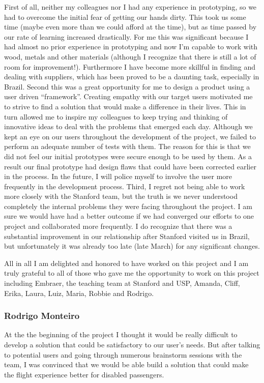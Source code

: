 First of all, neither my colleagues nor I had any experience in prototyping, so we had to overcome the initial fear of getting our hands dirty. This took us some time (maybe even more than we could afford at the time), but as time passed by our rate of learning increased drastically. For me this was significant because I had almost no prior experience in prototyping and now I’m capable to work with wood, metals and other materials (although I recognize that there is still a lot of room for improvement!). Furthermore I have become more skillful in finding and dealing with suppliers, which has been proved to be a daunting task, especially in Brazil.
Second this was a great opportunity for me to design a product using a user driven “framework”. Creating empathy with our target users motivated me to strive to find a solution that would make a difference in their lives. This in turn allowed me to inspire my colleagues to keep trying and thinking of innovative ideas to deal with the problems that emerged each day. Although we kept an eye on our users throughout the development of the project, we failed to perform an adequate number of tests with them. The reason for this is that we did not feel our initial prototypes were secure enough to be used by them. As a result our final prototype had design flaws that could have been corrected earlier in the process. In the future, I will police myself to involve the user more frequently in the development process.
Third, I regret not being able to work more closely with the Stanford team, but the truth is we never understood completely the internal problems they were facing throughout the project. I am sure we would have had a better outcome if we had converged our efforts to one project and collaborated more frequently. I do recognize that there was a substantial improvement in our relationship after Stanford visited us in Brazil, but unfortunately it was already too late (late March) for any significant changes.

All in all I am delighted and honored to have worked on this project and I am truly grateful to all of those who gave me the opportunity to work on this project including Embraer, the teaching team at Stanford and USP, Amanda, Cliff, Erika, Laura, Luiz, Maria, Robbie and Rodrigo.

\subsubsection{Rodrigo Monteiro}

At the the beginning of the project I thought it would be really difficult to develop a solution that could be satisfactory to our user's needs. But after talking to potential users and  going through numerous brainstorm sessions with the team, I was convinced that we would be able build a solution that could make the flight experience better for disabled passengers.

